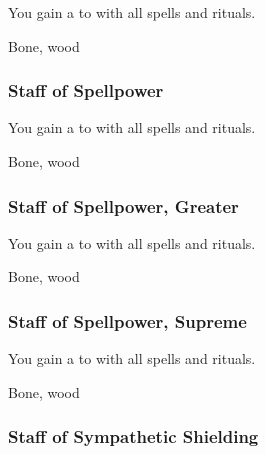 You gain a   to  with all spells and rituals.



 


 Bone, wood


\lowercase{\hypertarget{item:Staff of Spellpower}{}}\label{item:Staff of Spellpower}
\hypertarget{item:Staff of Spellpower}{\subsubsection{Staff of Spellpower\hfill{}}}

You gain a   to  with all spells and rituals.



 


 Bone, wood


\lowercase{\hypertarget{item:Staff of Spellpower, Greater}{}}\label{item:Staff of Spellpower, Greater}
\hypertarget{item:Staff of Spellpower, Greater}{\subsubsection{Staff of Spellpower, Greater\hfill{}}}

You gain a   to  with all spells and rituals.



 


 Bone, wood


\lowercase{\hypertarget{item:Staff of Spellpower, Supreme}{}}\label{item:Staff of Spellpower, Supreme}
\hypertarget{item:Staff of Spellpower, Supreme}{\subsubsection{Staff of Spellpower, Supreme\hfill{}}}

You gain a   to  with all spells and rituals.



 


 Bone, wood


\lowercase{\hypertarget{item:Staff of Sympathetic Shielding}{}}\label{item:Staff of Sympathetic Shielding}
\hypertarget{item:Staff of Sympathetic Shielding}{\subsubsection{Staff of Sympathetic Shielding\hfill{}}}

